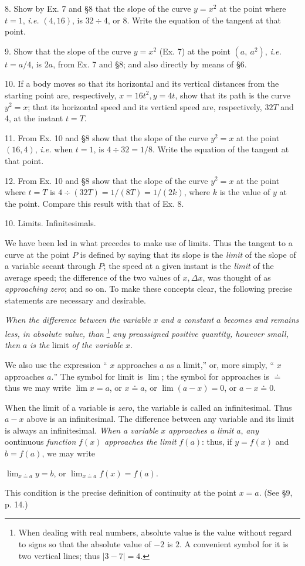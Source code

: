 \documentclass[12pt]{article}
\begin{document}
8. Show by Ex. 7 and \S 8 that the slope of the curve $y=x^{2}$ at the
point where $t=1$, {\it i.e.} $(4,16)$, is $32 \div 4$, or 8. Write the
equation of the tangent at that point.

9. Show that the slope of the curve $y=x^{2}$ (Ex. 7) at the point 
$(a,\ a^{2})$, {\it i.e.} $t=a/4$, is $2a$, from Ex. 7 and \S 8; and also directly by means of \S 6.

10. If a body moves so that its horizontal and its vertical distances
from the starting point are, respectively, $x=16t^{2}, y=4t$, show that its
path is the curve $y^{2}=x$; that its horizontal speed and its vertical speed
are, respectively, $32 T$ and 4, at the instant $t=T$.

11. From Ex. 10 and \S 8 show that the slope of the curve $y^{2}=x$ at the
point $(16, 4)$, {\it i.e.} when $t=1$, is $4\div 32=1/8$. Write the equation of the tangent at that point.

12. From Ex. 10 and \S 8 show that the slope of the curve $y^{2}=x$ at the
point where $t=T$ is $4\div(32T)=1/(8T)=1/(2k)$, where $k$ is the value
of $y$ at the point. Compare this result with that of Ex. 8.

10. Limits. Infinitesimals.

We have been led in what precedes to make use of limits. 
Thus the tangent to a curve at
the point $P$ is defined by saying that its slope is the {\it limit} of
the slope of a variable secant through $P$; the speed at a given
instant is the {\it limit} of the average speed; the difference of the
two values of $x, \Delta x$, was thought of as {\it approaching zero}; and
so on. To make these concepts clear, the following precise
statements are necessary and desirable.

{\it When the difference between the variable} $x$ {\it and a constant} $a$ {\it becomes and remains less, in absolute value, than} \footnote{
When dealing with real numbers, absolute value is the value without
regard to signs so that the absolute value of $-2$ is $2$. A convenient symbol
for it is two vertical lines; thus $|3-7|=4$.}
{\it any preassigned positive quantity, however small, then} $a$ {\it is the} limit {\it of the variable} $x$.

We also use the expression `` $x$ approaches $a$ as a limit,'' or,
more simply, `` $x$ approaches $a.$'' The symbol for limit is $\lim$;
the symbol for approaches is $\doteq$ thus we may write 
$\lim x=a$, or $x \doteq a$, or $\lim(a-x)=0$, or $a-x \doteq 0$.

When the limit of a variable is {\it zero}, the variable is called
an infinitesimal. Thus $a-x$ above is an infinitesimal. The
difference between any variable and its limit is always an 
infinitesimal. {\it When a variable} $x$ {\it approaches a limit} $a$, 
{\it any} oontinuous {\it function} $f(x)$ {\it approaches the limit} $f(a)$: thus, if $y=f(x)$ and $b=f(a)$, we may write
\begin{center}
$\displaystyle \lim_{x \doteq a}y=b$, or 
$\displaystyle \lim_{x \doteq a}f(x)=f(a)$.
\end{center}
This condition is the precise definition of continuity at the
point $x=a$. (See \S 9, p. 14.)
\end{document}
